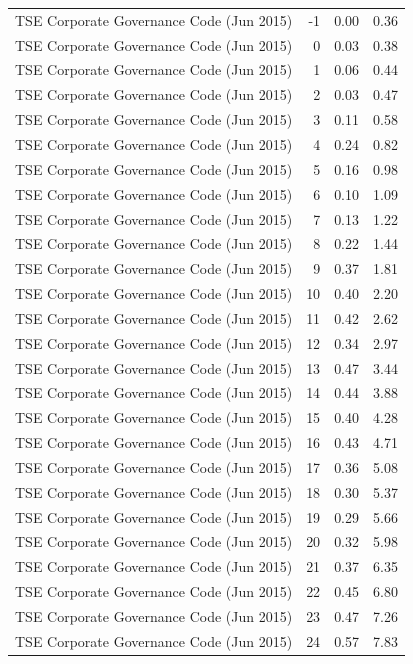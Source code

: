\begin{table}
\begin{tabular}{lrrr}
TSE Corporate Governance Code (Jun 2015) & -1 & 0.00 & 0.36 \\
TSE Corporate Governance Code (Jun 2015) & 0 & 0.03 & 0.38 \\
TSE Corporate Governance Code (Jun 2015) & 1 & 0.06 & 0.44 \\
TSE Corporate Governance Code (Jun 2015) & 2 & 0.03 & 0.47 \\
TSE Corporate Governance Code (Jun 2015) & 3 & 0.11 & 0.58 \\
TSE Corporate Governance Code (Jun 2015) & 4 & 0.24 & 0.82 \\
TSE Corporate Governance Code (Jun 2015) & 5 & 0.16 & 0.98 \\
TSE Corporate Governance Code (Jun 2015) & 6 & 0.10 & 1.09 \\
TSE Corporate Governance Code (Jun 2015) & 7 & 0.13 & 1.22 \\
TSE Corporate Governance Code (Jun 2015) & 8 & 0.22 & 1.44 \\
TSE Corporate Governance Code (Jun 2015) & 9 & 0.37 & 1.81 \\
TSE Corporate Governance Code (Jun 2015) & 10 & 0.40 & 2.20 \\
TSE Corporate Governance Code (Jun 2015) & 11 & 0.42 & 2.62 \\
TSE Corporate Governance Code (Jun 2015) & 12 & 0.34 & 2.97 \\
TSE Corporate Governance Code (Jun 2015) & 13 & 0.47 & 3.44 \\
TSE Corporate Governance Code (Jun 2015) & 14 & 0.44 & 3.88 \\
TSE Corporate Governance Code (Jun 2015) & 15 & 0.40 & 4.28 \\
TSE Corporate Governance Code (Jun 2015) & 16 & 0.43 & 4.71 \\
TSE Corporate Governance Code (Jun 2015) & 17 & 0.36 & 5.08 \\
TSE Corporate Governance Code (Jun 2015) & 18 & 0.30 & 5.37 \\
TSE Corporate Governance Code (Jun 2015) & 19 & 0.29 & 5.66 \\
TSE Corporate Governance Code (Jun 2015) & 20 & 0.32 & 5.98 \\
TSE Corporate Governance Code (Jun 2015) & 21 & 0.37 & 6.35 \\
TSE Corporate Governance Code (Jun 2015) & 22 & 0.45 & 6.80 \\
TSE Corporate Governance Code (Jun 2015) & 23 & 0.47 & 7.26 \\
TSE Corporate Governance Code (Jun 2015) & 24 & 0.57 & 7.83 \\

\end{tabular}
\end{table}
